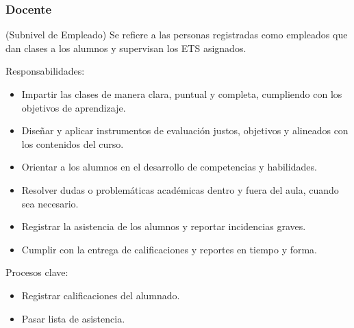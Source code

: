 \begin{Usuario}{\hypertarget{tDocenteAplicador}{\subsubsection{Docente}}}{(Subnivel de Empleado)}{
        Se refiere a las personas registradas como empleados que dan clases a los alumnos y supervisan los ETS asignados.
    }
    \item[Responsabilidades:] \cdtEmpty
    \begin{itemize}
        \item Impartir las clases de manera clara, puntual y completa, cumpliendo con los objetivos de aprendizaje.
        \item Diseñar y aplicar instrumentos de evaluación justos, objetivos y alineados con los contenidos del curso.
        \item Orientar a los alumnos en el desarrollo de competencias y habilidades.
        \item Resolver dudas o problemáticas académicas dentro y fuera del aula, cuando sea necesario.
        \item Registrar la asistencia de los alumnos y reportar incidencias graves.
        \item Cumplir con la entrega de calificaciones y reportes en tiempo y forma.
    \end{itemize}
    \item[Procesos clave:] \cdtEmpty
    \begin{itemize}
         \item Registrar calificaciones del alumnado.
         \item Pasar lista de asistencia.
    \end{itemize}
\end{Usuario}

